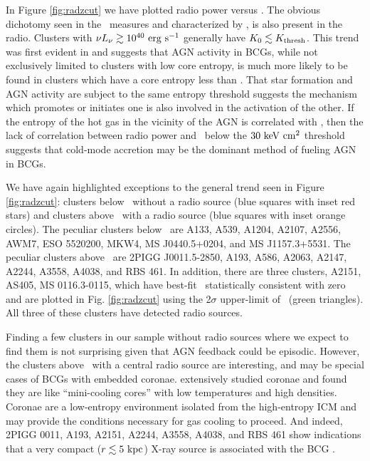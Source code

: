 \documentclass{emulateapj}
\begin{document}
In Figure \ref{fig:radzcut} we have plotted radio power versus \kna.
The obvious dichotomy seen in the \halpha\ measures and characterized
by \kthr, is also present in the radio. Clusters with $\nu L_{\nu}
\gtrsim 10^{40} \mathrm{\mbox{\ensuremath{\mathrm{~erg}}} \mathrm{\mbox{\ensuremath{\mathrm{~s}}}^{-1}}}$ generally have $K_0 \lesssim K_{\mathrm{thresh}}$. This trend
was first evident in \citet{radioquiet} and suggests that AGN activity
in BCGs, while not exclusively limited to clusters with low core
entropy, is much more likely to be found in clusters which have a core
entropy less than \kthr. That star formation and AGN activity are
subject to the same entropy threshold suggests the mechanism which
promotes or initiates one is also involved in the activation of the
other. If the entropy of the hot gas in the vicinity of the AGN is
correlated with \kna, then the lack of correlation between radio power
and \kna\ below the $30 \mathrm{\mbox{\ensuremath{\mathrm{~keV}}} \mathrm{\mbox{\ensuremath{\mathrm{~cm}}}^2}}$ threshold suggests that cold-mode
accretion \citep{pizzolato05, hardcastle07} may be the dominant method
of fueling AGN in BCGs.

We have again highlighted exceptions to the general trend seen in
Figure \ref{fig:radzcut}: clusters below \kthr\ without a radio source
(blue squares with inset red stars) and clusters above \kthr\ with a
radio source (blue squares with inset orange circles). The peculiar
clusters below \kthr\ are A133, A539, A1204, A2107, A2556, AWM7, ESO
5520200, MKW4, MS J0440.5+0204, and MS J1157.3+5531. The peculiar
clusters above \kthr\ are 2PIGG J0011.5-2850, A193, A586, A2063,
A2147, A2244, A3558, A4038, and RBS 461. In addition, there are three
clusters, A2151, AS405, MS 0116.3-0115, which have best-fit
\kna\ statistically consistent with zero and are plotted in
Fig. \ref{fig:radzcut} using the 2$\sigma$ upper-limit of \kna\ (green
triangles). All three of these clusters have detected radio sources.

Finding a few clusters in our sample without radio sources where we
expect to find them is not surprising given that AGN feedback could be
episodic. However, the clusters above \kthr\ with a central radio
source are interesting, and may be special cases of BCGs with embedded
coronae. \cite{coronae} extensively studied coronae and found they are
like ``mini-cooling cores'' with low temperatures and high
densities. Coronae are a low-entropy environment isolated from the
high-entropy ICM and may provide the conditions necessary for gas
cooling to proceed. And indeed, 2PIGG 0011, A193, A2151, A2244, A3558,
A4038, and RBS 461 show indications that a very compact ($r \lesssim
5\mbox{\ensuremath{\mathrm{~kpc}}}$) X-ray source is associated with the BCG \citep{accept}.
\end{document}
